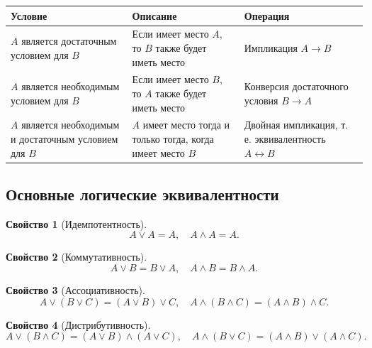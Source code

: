 \documentclass[a5paper, 11pt]{extarticle}
\theoremstyle{definition}
\newtheorem{property}{Свойство}[subsection]
\theoremstyle{definition}
\theoremstyle{definition}
\numberwithin{figure}{section}
\numberwithin{table}{section}
\begin{document}
\begin{table}[H]
    \renewcommand*{\arraystretch}{1.5}
    \begin{longtable}{|C{0.27\textwidth}|C{0.27\textwidth}|C{0.27\textwidth}|}
        \hline
        \textbf{Условие}                                            & \textbf{Описание}                                               & \textbf{Операция}                                                 \\
        \hline
        \(A\) является достаточным условием для \(B\)               & Если имеет место \(A\), то \(B\) также будет иметь место        & Импликация \(A \to B\)                                            \\
        \hline
        \(A\) является необходимым условием для \(B\)               & Если имеет место \(B\), то \(A\) также будет иметь место        & Конверсия достаточного условия \(B \to A\)                        \\
        \hline
        \(A\) является необходимым и достаточным условием для \(B\) & \(A\) имеет место тогда и только тогда, когда имеет место \(B\) & Двойная импликация, т. е. эквивалентность \(A \leftrightarrow B\) \\
        \hline
    \end{longtable}
\end{table}

\subsection{Основные логические эквивалентности}

\begin{property}[Идемпотентность]
    \[
        A \lor A = A,
        \quad
        A \land A = A.
    \]
\end{property}

\begin{property}[Коммутативность]
    \[
        A \lor B = B \lor A,
        \quad
        A \land B = B \land A.
    \]
\end{property}

\begin{property}[Ассоциативность]
    \[
        A \lor (B \lor C) = (A \lor B) \lor C,
        \quad
        A \land (B \land C) = (A \land B) \land C.
    \]
\end{property}

\begin{property}[Дистрибутивность]
    \[
        A \lor (B \land C) = (A \lor B) \land (A \lor C),
        \quad
        A \land (B \lor C) = (A \land B) \lor (A \land C).
    \]
\end{property}
\end{document}
